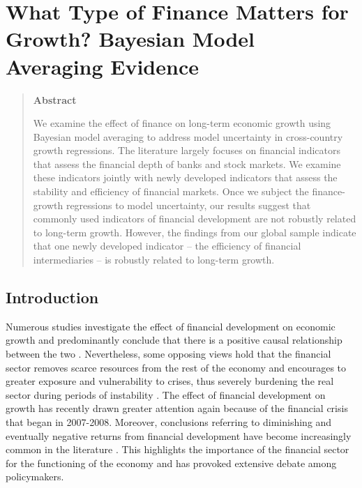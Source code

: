 \chapter{What Type of Finance Matters for Growth? Bayesian Model Averaging Evidence}
\label{ch2}

\begin{quote}
\begin{center}\textbf{Abstract}\end{center}
	We examine the effect of finance on long-term economic growth using Bayesian model averaging to address model uncertainty in cross-country growth regressions. The literature largely focuses on financial indicators that assess the financial depth of banks and stock markets. We examine these indicators jointly with newly developed indicators that assess the stability and efficiency of financial markets. Once we subject the finance-growth regressions to model uncertainty, our results suggest that commonly used indicators of financial development are not robustly related to long-term growth. However, the findings from our global sample indicate that one newly developed indicator -- the efficiency of financial intermediaries -- is robustly related to long-term growth.     
	\end{quote}

\clearpage
\section{Introduction}
\label{ch2sec:intro}
Numerous studies investigate the effect of financial development on economic growth and predominantly conclude that there is a positive causal relationship between the two \citep{KingLevine1993a, LevineZervos1998, AtjeJovanovich1993}. Nevertheless, some opposing views hold that the financial sector removes scarce resources from the rest of the economy \citep{Tobin1984,Boltonetal2011} and encourages to greater exposure and vulnerability to crises, thus severely burdening the real sector during periods of instability \citep{Kindelberger1978,Minsky1991,Stiglitz2000}. The effect of financial development on growth has recently drawn greater attention again because of the financial crisis that began in 2007-2008. Moreover, conclusions referring to diminishing and eventually negative returns from financial development have become increasingly common in the literature \citep{Arcandetal2012,CecchettiKharroubi2012,LawSingh2014}. This highlights the importance of the financial sector for the functioning of the economy and has provoked extensive debate among policymakers. 

